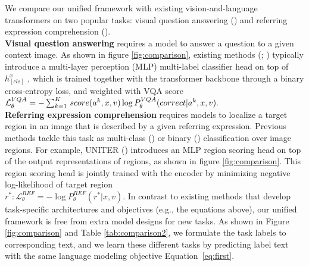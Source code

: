 \documentclass[twocolumn,3p,a4paper,preprint,11pt,margin=2.5cm]{elsarticle}
\begin{document}
We compare our unified framework with existing vision-and-language transformers on two popular tasks: visual question
answering (\cite{Anderson}) and referring expression
comprehension (\cite{Hudson}).\\[0.4 cm]
\textbf{Visual question answering }requires a model to answer
a question to a given context image. As shown in figure \ref{fig:comparison}, existing methods (\cite{Anderson}; \cite{XinleiChen})  typically introduce a multi-layer perception (MLP) multi-label classifier head on
top of $ h_{[cls]}^x $ , which is trained together with the transformer backbone through a binary cross-entropy loss, and weighted with VQA score\\[0.2 cm]
$\mathcal{L}_{\theta}^{VQA} = -\\
\sum_{k=1}^{K}\,score(a^{k},x,v) \log P_{\theta}^{VQA}(correct|a^{k}, x, v).$\\[0.4 cm]
\textbf{Referring expression comprehension }requires models to
localize a target region in an image that is described by
a given referring expression. Previous methods tackle
this task as multi-class (\cite{XinleiChen}) or binary (\cite{MingWeiChang}) classification over image regions. For example, UNITER (\cite{XinleiChen}) introduces an MLP region
scoring head on top of the output representations of regions, as shown in figure \ref{fig:comparison}. This region scoring head is jointly trained with the encoder by minimizing negative log-likelihood of target region\\[0.4 cm]
$ r^{*}: \mathcal{L}_{\theta}^{REF} = - \log P_{\theta}^{REF}(r^{*}|x,v).$
In contrast to existing methods that develop task-specific
architectures and objectives (e.g., the equations above), our
unified framework is free from extra model designs for new
tasks. As shown in Figure \ref{fig:comparison} and Table \ref{tab:comparison2}, we formulate
the task labels to corresponding text, and we learn these different tasks by predicting label text with the same language modeling objective Equation~\ref{eq:first}.
\end{document}
